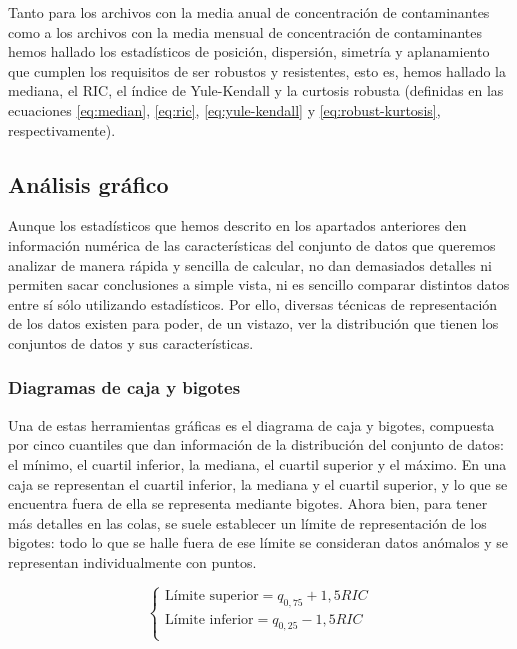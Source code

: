 \documentclass[12pt]{article}
\begin{document}
Tanto para los archivos con la media anual de concentración de contaminantes como a los archivos con la media mensual de concentración de contaminantes hemos hallado los estadísticos de posición, dispersión, simetría y aplanamiento que cumplen los requisitos de ser robustos y resistentes, esto es, hemos hallado la mediana, el RIC, el índice de Yule-Kendall y la curtosis robusta (definidas en las ecuaciones \ref{eq:median}, \ref{eq:ric}, \ref{eq:yule-kendall} y \ref{eq:robust-kurtosis}, respectivamente).

\subsection{Análisis gráfico}

Aunque los estadísticos que hemos descrito en los apartados anteriores den información numérica de las características del conjunto de datos que queremos analizar de manera rápida y sencilla de calcular, no dan demasiados detalles ni permiten sacar conclusiones a simple vista, ni es sencillo comparar distintos datos entre sí sólo utilizando estadísticos. Por ello, diversas técnicas de representación de los datos existen para poder, de un vistazo, ver la distribución que tienen los conjuntos de datos y sus características.

\subsubsection{Diagramas de caja y bigotes}

Una de estas herramientas gráficas es el diagrama de caja y bigotes, compuesta por cinco cuantiles que dan información de la distribución del conjunto de datos: el mínimo, el cuartil inferior, la mediana, el cuartil superior y el máximo. En una caja se representan el cuartil inferior, la mediana y el cuartil superior, y lo que se encuentra fuera de ella se representa mediante bigotes. Ahora bien, para tener más detalles en las colas, se suele establecer un límite de representación de los bigotes: todo lo que se halle fuera de ese límite se consideran datos anómalos y se representan individualmente con puntos.

\begin{equation}
\begin{cases}
\text{Límite superior} = q_{0,75} + 1,5 RIC \\
\text{Límite inferior} = q_{0,25} - 1,5 RIC \\
\end{cases}
\label{boxplot_fence}
\end{equation}
\end{document}
